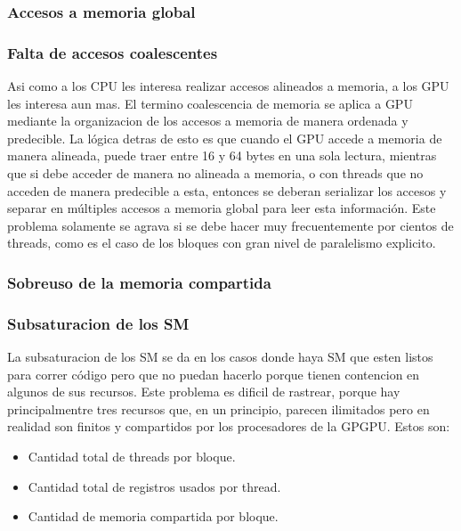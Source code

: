 \subsubsection{Accesos a memoria global}

\subsubsection{Falta de accesos coalescentes}
Asi como a los CPU les interesa realizar accesos alineados a memoria, a los GPU les
interesa aun mas. El termino coalescencia de memoria se aplica a GPU mediante
la organizacion de los accesos a memoria de manera ordenada y predecible. La l\'ogica
detras de esto es que cuando el GPU accede a memoria de manera alineada, puede traer
entre 16 y 64 bytes en una sola lectura, mientras que si debe acceder de manera no
alineada a memoria, o con threads que no acceden de manera predecible a esta, entonces
se deberan serializar los accesos y separar en m\'ultiples accesos a memoria global para leer
esta informaci\'on. Este problema solamente se agrava si se debe hacer muy frecuentemente
por cientos de threads, como es el caso de los bloques con gran nivel de paralelismo explicito.

\subsubsection{Sobreuso de la memoria compartida}

\subsubsection{Subsaturacion de los SM}
La subsaturacion de los SM se da en los casos donde haya SM que esten listos para correr
c\'odigo pero que no puedan hacerlo porque tienen contencion en algunos de sus recursos.
Este problema es dificil de rastrear, porque hay principalmentre tres recursos que,
en un principio, parecen ilimitados pero en realidad son finitos y compartidos por
los procesadores de la GPGPU. Estos son:
\begin{itemize}
\item Cantidad total de threads por bloque.
\item Cantidad total de registros usados por thread.
\item Cantidad de memoria compartida por bloque.
\end{itemize}

